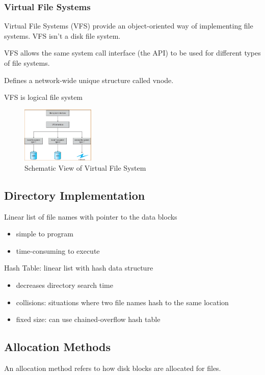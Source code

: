 \subsubsection{Virtual File Systems}
Virtual File Systems (VFS) provide an object-oriented way of implementing file systems. VFS isn't a disk file system. 

VFS allows the same system call interface (the API) to be used for different types of file systems.

Defines a network-wide unique structure called vnode. 

VFS is logical file system

\begin{figure}[!htb]%
    \centering
    \includegraphics[width=0.309\textwidth]{pic/OS11/Schematic View of Virtual File System}
    \caption{Schematic View of Virtual File System}
\end{figure}

\subsection{Directory Implementation}
Linear list of file names with pointer to the data blocks
\begin{itemize}
    \item simple to program
    \item time-consuming to execute
\end{itemize}

Hash Table: linear list with hash data structure
\begin{itemize}
    \item decreases directory search time
    \item collisions: situations where two file names hash to the same
    location
    \item fixed size: can use chained-overflow hash table
\end{itemize}

\subsection{Allocation Methods}
An allocation method refers to how disk blocks are allocated for files. 

